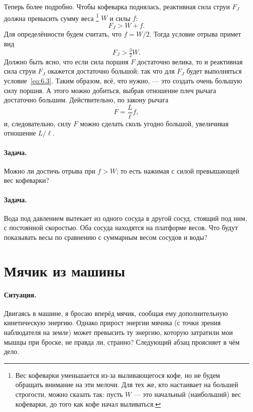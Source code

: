 Теперь более подробно.
Чтобы кофеварка поднялась, реактивная сила струи $F_J$ должна превысить сумму веса%
\footnote{Вес кофеварки уменьшается из-за выливающегося кофе, но не будем обращать внимание на эти мелочи.
Для тех же, кто настаивает на большей строгости, можно сказать так: пусть $W$ — это начальный (наибольший) вес кофеварки, до того как кофе начал выливаться.}
$W$ и силы $f$:
\begin{equation}
F_J > W + f.
\label{eq:6.2}
\end{equation}
Для определённости будем считать, что $f = W/2$.
Тогда условие отрыва примет вид
\begin{equation}
F_J > \tfrac32W.
\label{eq:6.3}
\end{equation}
Должно быть ясно, что если сила поршня $F$ достаточно велика,
то и реактивная сила струи $F_J$ окажется достаточно большой;
так что для $F_J$ будет выполняться условие~\eqref{eq:6.3}.
Таким образом, всё, что нужно, — это создать очень большую силу поршня.
А этого можно добиться, выбрав отношение плеч рычага достаточно большим.
Действительно, по закону рычага
\[
F = \frac{L}{\ell} f,
\]
и, следовательно, силу $F$ можно сделать сколь угодно большой,
увеличивая отношение $L/\ell$.

\paragraph{Задача.}
Можно ли достичь отрыва при $f > W$; то есть нажимая с силой превышающей вес кофеварки?

\paragraph{Задача.}
Вода под давлением вытекает из одного сосуда в другой сосуд, стоящий под ним, с постоянной скоростью.
Оба сосуда находятся на платформе весов.
Что будут показывать весы по сравнению с суммарным весом сосудов и воды?

\section{Мячик из машины}\label{Мячик из машины}

\paragraph{Ситуация.}
Двигаясь в машине, я бросаю вперёд мячик, сообщая ему дополнительную кинетическую энергию.
Однако прирост энергии мячика (с точки зрения наблюдателя на земле) может превысить ту энергию, которую затратили мои мышцы при броске, не правда ли, странно?
Следующий абзац проясняет в чём дело.

